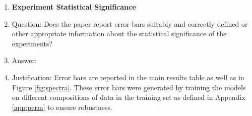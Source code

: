 \documentclass{article}
\begin{document}
\begin{enumerate}
\item {\bf Experiment Statistical Significance}
    \item[] Question: Does the paper report error bars suitably and correctly defined or other appropriate information about the statistical significance of the experiments?
    \item[] Answer: \answerYes{} %
    \item[] Justification: Error bars are reported in the main results table as well as in Figure \ref{fig:spectra}. These error bars were generated by training the models on different compositions of data in the training set as defined in Appendix \ref{app:perm} to ensure robustness.


\end{enumerate}
\end{document}
